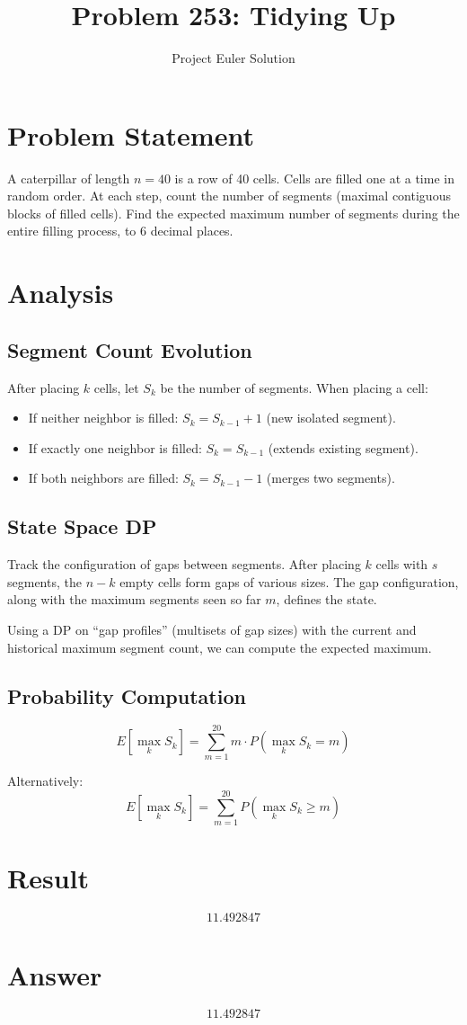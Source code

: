 \documentclass[12pt]{article}
\title{Problem 253: Tidying Up}
\author{Project Euler Solution}
\date{}
\begin{document}
\maketitle

\section{Problem Statement}
A caterpillar of length $n=40$ is a row of 40 cells. Cells are filled one at a time in random order. At each step, count the number of segments (maximal contiguous blocks of filled cells). Find the expected maximum number of segments during the entire filling process, to 6 decimal places.

\section{Analysis}

\subsection{Segment Count Evolution}
After placing $k$ cells, let $S_k$ be the number of segments. When placing a cell:
\begin{itemize}
    \item If neither neighbor is filled: $S_k = S_{k-1} + 1$ (new isolated segment).
    \item If exactly one neighbor is filled: $S_k = S_{k-1}$ (extends existing segment).
    \item If both neighbors are filled: $S_k = S_{k-1} - 1$ (merges two segments).
\end{itemize}

\subsection{State Space DP}
Track the configuration of gaps between segments. After placing $k$ cells with $s$ segments, the $n-k$ empty cells form gaps of various sizes. The gap configuration, along with the maximum segments seen so far $m$, defines the state.

Using a DP on ``gap profiles'' (multisets of gap sizes) with the current and historical maximum segment count, we can compute the expected maximum.

\subsection{Probability Computation}
\[
E\!\left[\max_{k} S_k\right] = \sum_{m=1}^{20} m \cdot P\!\left(\max_k S_k = m\right)
\]

Alternatively:
\[
E\!\left[\max_{k} S_k\right] = \sum_{m=1}^{20} P\!\left(\max_k S_k \ge m\right)
\]

\section{Result}
\[
\boxed{11.492847}
\]

\section{Answer}

\[
\boxed{11.492847}
\]
\end{document}
